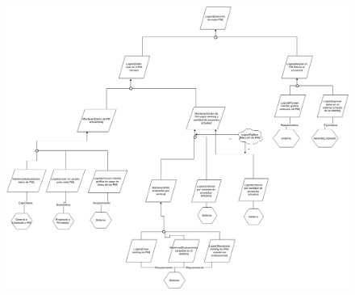 \newpage
\begin{figure}[ht!]
    \centering
    \includegraphics[width=8in, keepaspectratio, angle=90]{imagenes/seleccion.png}
\end{figure}
